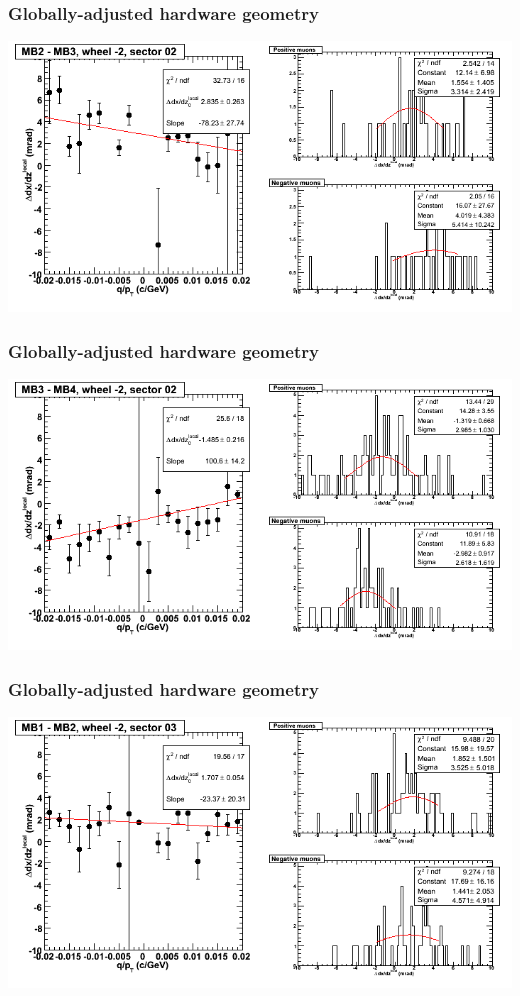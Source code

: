 \documentclass[compress]{beamer}
\begin{document}
\begin{frame}
\frametitle{Globally-adjusted hardware geometry}
\includegraphics[width=\linewidth]{NOV4_segdiffs_HW/dt13_slope_A_02_23.png}
\end{frame}

\begin{frame}
\frametitle{Globally-adjusted hardware geometry}
\includegraphics[width=\linewidth]{NOV4_segdiffs_HW/dt13_slope_A_02_34.png}
\end{frame}

\begin{frame}
\frametitle{Globally-adjusted hardware geometry}
\includegraphics[width=\linewidth]{NOV4_segdiffs_HW/dt13_slope_A_03_12.png}
\end{frame}
\end{document}
